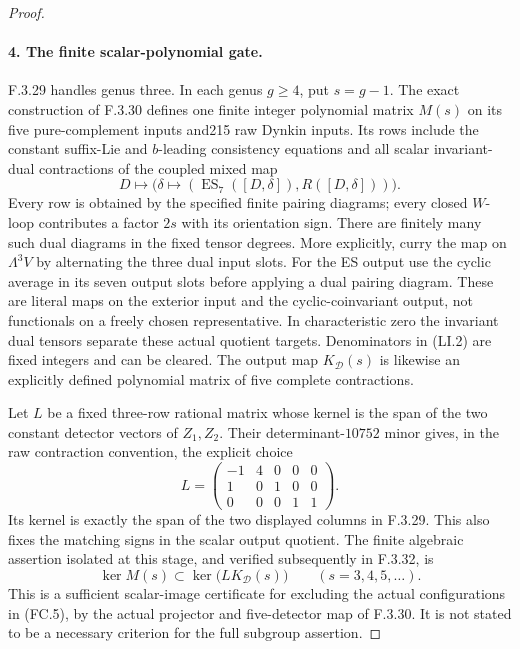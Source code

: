 \begin{proof}
\paragraph{4. The finite scalar-polynomial gate.}
F.3.29 handles genus three. In each genus
$g\geq4$, put $s=g-1$. The exact construction
of F.3.30 defines one finite integer
polynomial matrix $M(s)$ on its five
pure-complement inputs and215 raw Dynkin
inputs. Its rows include the constant
suffix-Lie and $b$-leading consistency
equations and all scalar invariant-dual
contractions of the coupled mixed map
\[
 D\longmapsto\bigl(\delta\mapsto
    (\operatorname{ES}_7([D,\delta]),R([D,\delta]))\bigr).
\]
Every row is obtained by the specified
finite pairing diagrams; every closed
$W$-loop contributes a factor $2s$ with
its orientation sign. There are finitely
many such dual diagrams in the fixed
tensor degrees. More explicitly, curry the
map on $\Lambda^3V$ by alternating the three
dual input slots. For the ES output use
the cyclic average in its seven output
slots before applying a dual pairing
diagram. These are literal maps on the
exterior input and the cyclic-coinvariant
output, not functionals on a freely
chosen representative. In characteristic
zero the invariant dual tensors separate
these actual quotient targets. Denominators in (LI.2)
are fixed integers and can be cleared.
The output map $K_{\mathcal D}(s)$ is
likewise an explicitly defined polynomial
matrix of five complete contractions.

Let $L$ be a fixed three-row rational matrix
whose kernel is the span of the two
constant detector vectors of $Z_1,Z_2$.
Their determinant-$10752$ minor gives, in the raw
contraction convention, the explicit choice
\[
 L=\begin{pmatrix}-1&4&0&0&0\\1&0&1&0&0\\0&0&0&1&1\end{pmatrix}.
\]
Its kernel is exactly the span of the two displayed
columns in F.3.29. This also fixes the matching signs
in the scalar output quotient.
The finite algebraic assertion isolated at this stage,
and verified subsequently in F.3.32, is
\[
 \ker M(s)\subset\ker\bigl(LK_{\mathcal D}(s)\bigr)
                    \qquad(s=3,4,5,\ldots).                \tag{FC.6}
\]
This is a sufficient scalar-image
certificate for excluding the actual
configurations in (FC.5), by the actual
projector and five-detector map of F.3.30.
It is not stated to be a necessary
criterion for the full subgroup assertion.


\end{proof}
